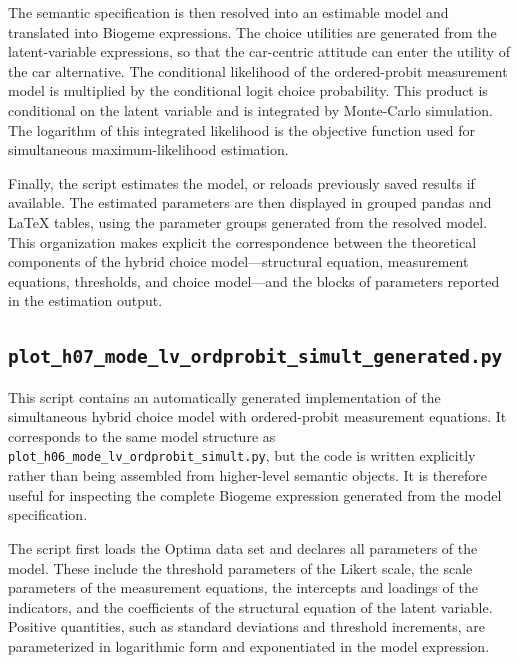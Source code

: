 \documentclass[12pt,a4paper]{article}
\let\OrigUnderscore\_
\def\_{\OrigUnderscore\penalty0\hspace{0pt}}%
\begin{document}
The semantic specification is then resolved into an estimable model
and translated into Biogeme expressions. The choice utilities are
generated from the latent-variable expressions, so that the
car-centric attitude can enter the utility of the car alternative. The
conditional likelihood of the ordered-probit measurement model is
multiplied by the conditional logit choice probability. This product
is conditional on the latent variable and is integrated by
Monte-Carlo simulation. The logarithm of this integrated likelihood is
the objective function used for simultaneous maximum-likelihood
estimation.

Finally, the script estimates the model, or reloads previously saved
results if available. The estimated parameters are then displayed in
grouped pandas and \LaTeX{} tables, using the parameter groups
generated from the resolved model. This organization makes explicit
the correspondence between the theoretical components of the hybrid
choice model---structural equation, measurement equations, thresholds,
and choice model---and the blocks of parameters reported in the
estimation output.

\subsection{\lstinline$plot_h07_mode_lv_ordprobit_simult_generated.py$}
\label{sec:plot_h07_mode_lv_ordprobit_simult_generated.py}


This script contains an automatically generated implementation of the
simultaneous hybrid choice model with ordered-probit measurement
equations. It corresponds to the same model structure as
\texttt{plot\_h06\_mode\_lv\_ordprobit\_simult.py}, but the code is
written explicitly rather than being assembled from higher-level
semantic objects. It is therefore useful for inspecting the complete
Biogeme expression generated from the model specification.

The script first loads the Optima data set and declares all parameters
of the model. These include the threshold parameters of the Likert
scale, the scale parameters of the measurement equations, the
intercepts and loadings of the indicators, and the coefficients of the
structural equation of the latent variable. Positive quantities, such
as standard deviations and threshold increments, are parameterized in
logarithmic form and exponentiated in the model expression.
\end{document}
